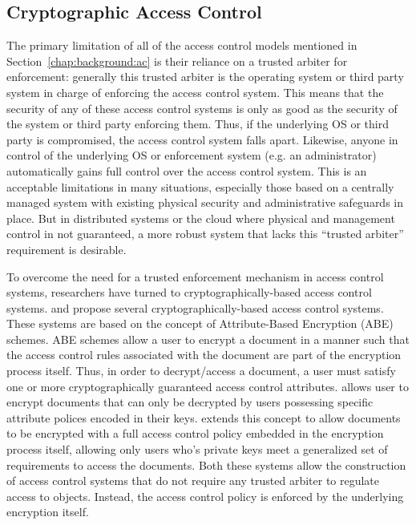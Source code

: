 \subsection{Cryptographic Access Control}

The primary limitation of all of the access control models mentioned
in Section~\ref{chap:background:ac} is their reliance on a trusted
arbiter for enforcement: generally this trusted arbiter is the
operating system or third party system in charge of enforcing the
access control system. This means that the security of any of these
access control systems is only as good as the security of the system
or third party enforcing them. Thus, if the underlying OS or third
party is compromised, the access control system falls apart. Likewise,
anyone in control of the underlying OS or enforcement system (e.g. an
administrator) automatically gains full control over the access
control system. This is an acceptable limitations in many situations,
especially those based on a centrally managed system with existing
physical security and administrative safeguards in place. But in
distributed systems or the cloud where physical and management control
in not guaranteed, a more robust system that lacks this ``trusted
arbiter'' requirement is desirable.

To overcome the need for a trusted enforcement mechanism in access
control systems, researchers have turned to cryptographically-based
access control systems. \cite{Goyal2006} and \cite{Bethencourt2007}
propose several cryptographically-based access control systems. These
systems are based on the concept of Attribute-Based Encryption (ABE)
schemes. ABE schemes allow a user to encrypt a document in a manner
such that the access control rules associated with the document are
part of the encryption process itself. Thus, in order to
decrypt/access a document, a user must satisfy one or more
cryptographically guaranteed access control attributes.
\cite{Goyal2006} allows user to encrypt documents that can only be
decrypted by users possessing specific attribute polices encoded in
their keys. \cite{Bethencourt2007} extends this concept to allow
documents to be encrypted with a full access control policy embedded
in the encryption process itself, allowing only users who's private
keys meet a generalized set of requirements to access the
documents. Both these systems allow the construction of access control
systems that do not require any trusted arbiter to regulate access to
objects. Instead, the access control policy is enforced by the
underlying encryption itself.

